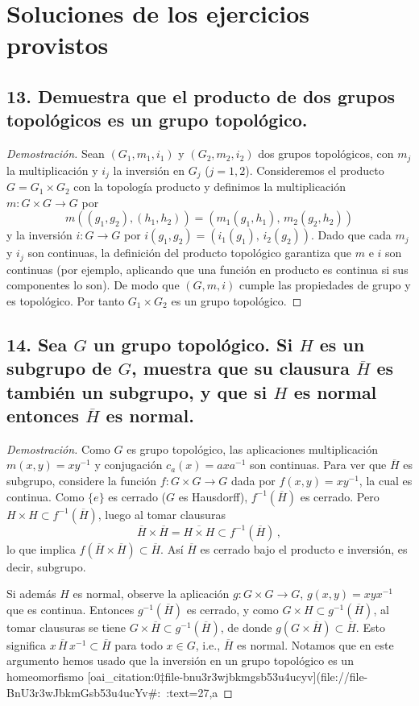 \documentclass{article}
\begin{document}
\section*{Soluciones de los ejercicios provistos}

\subsection*{13. Demuestra que el producto de dos grupos topológicos es un grupo topológico.}

\begin{proof}[Demostración]
Sean $(G_1,m_1,i_1)$ y $(G_2,m_2,i_2)$ dos grupos topológicos, con $m_j$ la multiplicación y $i_j$ la inversión en $G_j$ ($j=1,2$). Consideremos el producto $G=G_1\times G_2$ con la topología producto y definimos la multiplicación $m: G\times G\to G$ por 
\[
m((g_1,g_2),(h_1,h_2))=(m_1(g_1,h_1),\,m_2(g_2,h_2))
\] 
y la inversión $i:G\to G$ por $i(g_1,g_2)=(i_1(g_1),\,i_2(g_2))$. Dado que cada $m_j$ y $i_j$ son continuas, la definición del producto topológico garantiza que $m$ e $i$ son continuas (por ejemplo, aplicando que una función en producto es continua si sus componentes lo son). De modo que $(G,m,i)$ cumple las propiedades de grupo y es topológico. Por tanto $G_1\times G_2$ es un grupo topológico.
\end{proof}

\subsection*{14. Sea $G$ un grupo topológico. Si $H$ es un subgrupo de $G$, muestra que su clausura $\overline{H}$ es también un subgrupo, y que si $H$ es normal entonces $\overline{H}$ es normal.}

\begin{proof}[Demostración]
Como $G$ es grupo topológico, las aplicaciones multiplicación $m(x,y)=xy^{-1}$ y conjugación $c_a(x)=axa^{-1}$ son continuas. Para ver que $\overline{H}$ es subgrupo, considere la función $f:G\times G\to G$ dada por $f(x,y)=xy^{-1}$, la cual es continua. Como $\{e\}$ es cerrado ($G$ es Hausdorff), $f^{-1}(\overline{H})$ es cerrado. Pero $H\times H\subset f^{-1}(\overline{H})$, luego al tomar clausuras 
\[
\overline{H}\times\overline{H}
=\overline{H\times H}
\subset f^{-1}(\overline{H})\,,
\] 
lo que implica $f(\overline{H}\times \overline{H})\subset \overline{H}$. Así $\overline{H}$ es cerrado bajo el producto e inversión, es decir, subgrupo. 

Si además $H$ es normal, observe la aplicación $g:G\times G\to G$, $g(x,y)=xyx^{-1}$ que es continua. Entonces $g^{-1}(\overline{H})$ es cerrado, y como $G\times H\subset g^{-1}(\overline{H})$, al tomar clausuras se tiene $G\times\overline{H}\subset g^{-1}(\overline{H})$, de donde $g(G\times\overline{H})\subset \overline{H}$. Esto significa $x\,\overline{H}\,x^{-1}\subset\overline{H}$ para todo $x\in G$, i.e., $\overline{H}$ es normal. Notamos que en este argumento hemos usado que la inversión en un grupo topológico es un homeomorfismo [oai_citation:0‡file-bnu3r3wjbkmgsb53u4ucyv](file://file-BnU3r3wJbkmGsb53u4ucYv#:~:text=27,a%
\end{proof}
\end{document}
